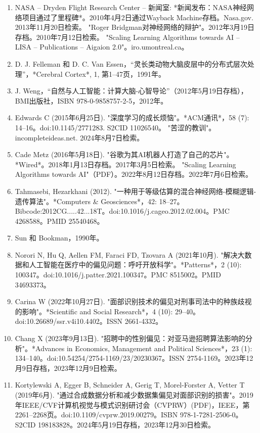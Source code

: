 \begin{enumerate}
\item NASA – Dryden Flight Research Center – 新闻室: *新闻发布：NASA神经网络项目通过了里程碑*。2010年4月2日通过Wayback Machine存档。Nasa.gov. 2013年11月20日检索。  
"Roger Bridgman对神经网络的辩护"。2012年3月19日存档。2010年7月12日检索。  
"Scaling Learning Algorithms towards AI – LISA – Publications – Aigaion 2.0"。iro.umontreal.ca。  
\item D. J. Felleman 和 D. C. Van Essen，“灵长类动物大脑皮层中的分布式层次处理”，*Cerebral Cortex*, 1, 第1–47页，1991年。  
\item J. Weng，“自然与人工智能：计算大脑-心智导论”（2012年5月19日存档），BMI出版社，ISBN 978-0-9858757-2-5，2012年。  
\item Edwards C (2015年6月25日). "深度学习的成长烦恼"。*ACM通讯*，58 (7): 14–16。doi:10.1145/2771283. S2CID 11026540。  
"苦涩的教训"。incompleteideas.net. 2024年8月7日检索。  
\item Cade Metz (2016年5月18日). "谷歌为其AI机器人打造了自己的芯片"。*Wired*。2018年1月13日存档。2017年3月5日检索。  
"Scaling Learning Algorithms towards AI"（PDF）。2022年8月12日存档。2022年7月6日检索。  
\item Tahmasebi, Hezarkhani (2012). "一种用于等级估算的混合神经网络-模糊逻辑-遗传算法"。*Computers & Geosciences*，42: 18–27。Bibcode:2012CG.....42...18T。doi:10.1016/j.cageo.2012.02.004。PMC 4268588。PMID 25540468。  
\item Sun 和 Bookman，1990年。  
\item Norori N, Hu Q, Aellen FM, Faraci FD, Tzovara A (2021年10月). "解决大数据和人工智能在医疗中的偏见问题：呼吁开放科学"。*Patterns*，2 (10): 100347。doi:10.1016/j.patter.2021.100347。PMC 8515002。PMID 34693373。  
\item Carina W (2022年10月27日). "面部识别技术的偏见对刑事司法中的种族歧视的影响"。*Scientific and Social Research*，4 (10): 29–40。doi:10.26689/ssr.v4i10.4402。ISSN 2661-4332。  
\item Chang X (2023年9月13日). "招聘中的性别偏见：对亚马逊招聘算法影响的分析"。*Advances in Economics, Management and Political Sciences*，23 (1): 134–140。doi:10.54254/2754-1169/23/20230367。ISSN 2754-1169。2023年12月9日存档，2023年12月9日检索。  
\item Kortylewski A, Egger B, Schneider A, Gerig T, Morel-Forster A, Vetter T (2019年6月). "通过合成数据分析和减少数据集偏见对面部识别的损害"。2019年IEEE/CVF计算机视觉与模式识别研讨会（CVPRW）(PDF)，IEEE，第2261–2268页。doi:10.1109/cvprw.2019.00279。ISBN 978-1-7281-2506-0。S2CID 198183828。2024年5月19日存档，2023年12月30日检索。  

\end{enumerate}
